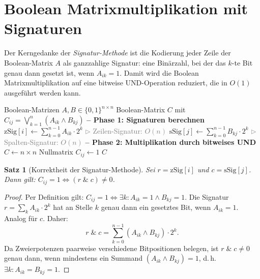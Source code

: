 ﻿\documentclass[a4paper,12pt,openany,oneside]{book}
\renewcommand{\algorithmiccomment}[1]{\hfill\textcolor{gray}{$\triangleright$ #1}}
\theoremstyle{definition}
\theoremstyle{plain}
\newtheorem{satz}{Satz}[chapter]
\theoremstyle{remark}
\begin{document}
\section{Boolean Matrixmultiplikation mit Signaturen}

Der Kerngedanke der \emph{Signatur-Methode} ist die Kodierung jeder Zeile
der Boolean-Matrix $A$ als ganzzahlige Signatur: eine Bin\"arzahl, bei der
das $k$-te Bit genau dann gesetzt ist, wenn $A_{ik} = 1$.
Damit wird die Boolean Matrixmultiplikation auf eine bitweise
UND-Operation reduziert, die in $O(1)$ ausgef\"uhrt werden kann.

\begin{algorithm}[H]
  \caption{Boolean Matrixmultiplikation mit Signaturen}
  \label{alg:bmm}
  \begin{algorithmic}[1]
    \Require Boolean-Matrizen $A, B \in \{0,1\}^{n \times n}$
    \Ensure Boolean-Matrix $C$ mit $C_{ij} = \bigvee_{k=1}^n (A_{ik} \wedge B_{kj})$
    \State \textbf{-- Phase 1: Signaturen berechnen}
      \State $\mathrm{zSig}[i] \gets \sum_{k=0}^{n-1} A_{ik} \cdot 2^k$
             \algorithmiccomment{Zeilen-Signatur: $O(n)$}
    \EndFor
      \State $\mathrm{sSig}[j] \gets \sum_{k=0}^{n-1} B_{kj} \cdot 2^k$
             \algorithmiccomment{Spalten-Signatur: $O(n)$}
    \EndFor
    \State \textbf{-- Phase 2: Multiplikation durch bitweises UND}
    \State $C \gets n \times n$ Nullmatrix
          \State $C_{ij} \gets 1$
        \EndIf
      \EndFor
    \EndFor
    \State \Return $C$
  \end{algorithmic}
\end{algorithm}

\begin{satz}[Korrektheit der Signatur-Methode]
  Sei $r = \mathrm{zSig}[i]$ und $c = \mathrm{sSig}[j]$. Dann gilt:
  $C_{ij} = 1 \Leftrightarrow (r \;\&\; c) \neq 0$.
\end{satz}

\begin{proof}
  Per Definition gilt:
  $C_{ij} = 1 \Leftrightarrow \exists k: A_{ik}=1 \wedge B_{kj}=1.$
  Die Signatur $r = \sum_{k} A_{ik} \cdot 2^k$ hat an Stelle $k$ genau
  dann ein gesetztes Bit, wenn $A_{ik}=1$.
  Analog f\"ur $c$. Daher:
  \[
    r \;\&\; c = \sum_{k=0}^{n-1}(A_{ik} \wedge B_{kj}) \cdot 2^k.
  \]
  Da Zweierpotenzen paarweise verschiedene Bitpositionen belegen, ist
  $r \;\&\; c \neq 0$ genau dann, wenn mindestens ein Summand
  $(A_{ik} \wedge B_{kj}) = 1$, d.\,h. $\exists k: A_{ik}=B_{kj}=1$.
\end{proof}
\end{document}
